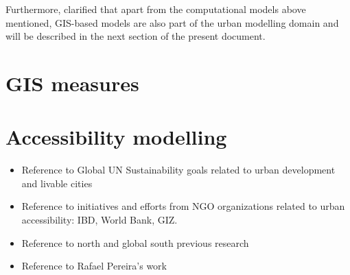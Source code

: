 \documentclass[12pt, a4paper]{report}
\begin{document}

Furthermore, \cite{battyUrbanModeling2009a} clarified that apart from the computational models above mentioned, GIS-based models are also part of the urban modelling domain and will be described in the next section of the present document.













\section{GIS measures}

\section{Accessibility modelling}

\begin{itemize}
  \item Reference to Global UN Sustainability goals related to urban development and livable cities
  \item Reference to initiatives and efforts from NGO organizations related to urban accessibility: IBD, World Bank, GIZ.
  \item Reference to north and global south previous research
  \item Reference to Rafael Pereira's work
\end{itemize}
\end{document}
